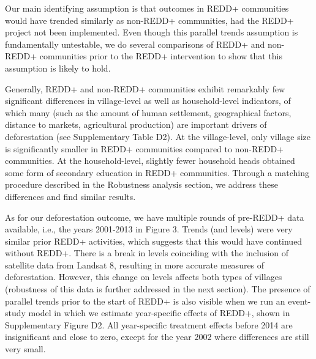 \documentclass[
]{article}
\begin{document}
Our main identifying assumption is that outcomes in REDD+ communities
would have trended similarly as non-REDD+ communities, had the REDD+
project not been implemented. Even though this parallel trends
assumption is fundamentally untestable, we do several comparisons of
REDD+ and non-REDD+ communities prior to the REDD+ intervention to show
that this assumption is likely to hold.

Generally, REDD+ and non-REDD+ communities exhibit remarkably few
significant differences in village-level as well as household-level
indicators, of which many (such as the amount of human settlement,
geographical factors, distance to markets, agricultural production) are
important drivers of deforestation (see Supplementary Table D2). At the
village-level, only village size is significantly smaller in REDD+
communities compared to non-REDD+ communities. At the household-level,
slightly fewer household heads obtained some form of secondary education
in REDD+ communities. Through a matching procedure described in the
Robustness analysis section, we address these differences and find
similar results.

As for our deforestation outcome, we have multiple rounds of pre-REDD+
data available, i.e., the years 2001-2013 in Figure 3. Trends (and
levels) were very similar prior REDD+ activities, which suggests that
this would have continued without REDD+. There is a break in levels
coinciding with the inclusion of satellite data from Landsat 8,
resulting in more accurate measures of deforestation. However, this
change on levels affects both types of villages (robustness of this data
is further addressed in the next section). The presence of parallel
trends prior to the start of REDD+ is also visible when we run an
event-study model in which we estimate year-specific effects of REDD+,
shown in Supplementary Figure D2. All year-specific treatment effects
before 2014 are insignificant and close to zero, except for the year
2002 where differences are still very small.
\end{document}
